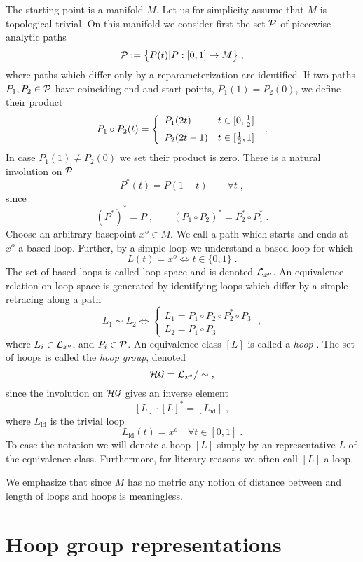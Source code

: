\documentclass[12pt]{article}
\def\cg{{\cal G}}
\def\ch{{\cal H}}
\def\cl{{\cal L}}
\def\cp{{\cal P}}
\newcommand{\id}{\operatorname{id}}
\begin{document}
The starting point is a manifold $M$. Let us for simplicity assume
that $M$ is topological trivial. On this manifold we
consider first the set $\cp$ of
piecewise analytic paths
\[
\cp :=\big\{ P(t)|P:[0,1]\rightarrow M  \big\}\;,
\]
where paths which differ only by a reparameterization
are identified. If two paths $P_1,P_2\in\cp$ have coinciding end and start
points, $P_1(1)=P_2(0)$, we define their product
\[
P_1\circ P_2( t) = \left\{
\begin{array}{ll}
P_1(2 t)  &  t\in[0,\tfrac{1}{2}]\vspace{2mm}  \\
P_2(2 t-1)&  t\in[\tfrac{1}{2},1]
\end{array}\right.\;.
\]
In case $P_1(1)\not=P_2(0)$ we set their product is zero. There is a natural involution on $\cp$
\[
P^\ast(t)=P(1-t)\qquad\forall t\;,
\]
since
\[
 (P^\ast)^\ast =P\;,\qquad (P_1\circ P_2)^\ast= P_2^{\ast}\circ P_1^\ast\;.
\]
Choose an arbitrary basepoint $x^o\in M$. We call a path which starts and ends at $x^o$ a based
loop. Further, by a simple loop we understand a based loop for which
\[
L(t)=x^o \Leftrightarrow t\in \{0,1 \}\;.
\]
 The set of
based loops is called loop space and is denoted $\cl_{x^o}$.
An equivalence relation on loop space is generated by identifying
loops which differ by a simple
retracing along a path   
\[
L_1 \sim L_2 \Leftrightarrow 
\left\{
\begin{array}{l}
L_1 = P_1 \circ P_2 \circ P_2^\ast \circ P_3\\
L_2 = P_1\circ P_3
\end{array}\right.\;,
\]
where $L_i\in\cl_{x^o}$, and $P_i\in\cp$. An equivalence class $[L]$ is called a {\it hoop} 
\cite{Ashtekar:1993wf}. The set of hoops is called the {\it hoop group},
denoted 
\[
\ch\cg=\cl_{x^o}/\sim\;,
\] 
since the involution on
$\ch\cg$ gives an inverse element
\[
[L]\cdot[L]^\ast =[L_{\id}]\;,
\]
where $L_{\id}$ is the trivial loop $$L_{\id}(t)= x^o\quad\forall t\in[0,1]\;.$$ To ease the
notation we will denote a hoop $[L]$ simply by an representative $L$ of the
equivalence class. Furthermore, for literary reasons we often call $[L]$ a loop.


We emphasize that since $M$ has no metric any notion of distance between and
length of loops
and hoops
is meaningless.



\section{Hoop group representations}
\label{Rep}
\end{document}
